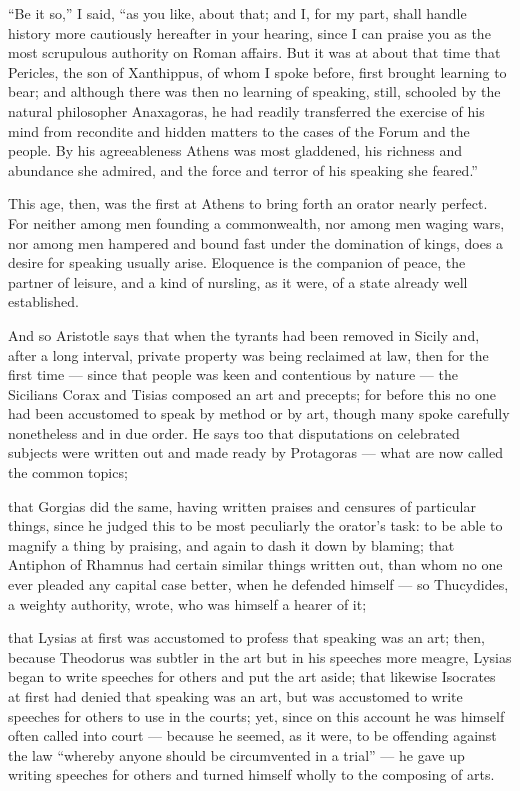  ``Be it so,'' I said, ``as you like, about that; and I, for my part, shall handle history more cautiously hereafter in your hearing, since I can praise you as the most scrupulous authority on Roman affairs. But it was at about that time that Pericles, the son of Xanthippus, of whom I spoke before, first brought learning to bear; and although there was then no learning of speaking, still, schooled by the natural philosopher Anaxagoras, he had readily transferred the exercise of his mind from recondite and hidden matters to the cases of the Forum and the people. By his agreeableness Athens was most gladdened, his richness and abundance she admired, and the force and terror of his speaking she feared.''

 This age, then, was the first at Athens to bring forth an orator nearly perfect. For neither among men founding a commonwealth, nor among men waging wars, nor among men hampered and bound fast under the domination of kings, does a desire for speaking usually arise. Eloquence is the companion of peace, the partner of leisure, and a kind of nursling, as it were, of a state already well established.

 And so Aristotle says that when the tyrants had been removed in Sicily and, after a long interval, private property was being reclaimed at law, then for the first time — since that people was keen and contentious by nature — the Sicilians Corax and Tisias composed an art and precepts; for before this no one had been accustomed to speak by method or by art, though many spoke carefully nonetheless and in due order. He says too that disputations on celebrated subjects were written out and made ready by Protagoras — what are now called the common topics;

 that Gorgias did the same, having written praises and censures of particular things, since he judged this to be most peculiarly the orator's task: to be able to magnify a thing by praising, and again to dash it down by blaming; that Antiphon of Rhamnus had certain similar things written out, than whom no one ever pleaded any capital case better, when he defended himself — so Thucydides, a weighty authority, wrote, who was himself a hearer of it;

 that Lysias at first was accustomed to profess that speaking was an art; then, because Theodorus was subtler in the art but in his speeches more meagre, Lysias began to write speeches for others and put the art aside; that likewise Isocrates at first had denied that speaking was an art, but was accustomed to write speeches for others to use in the courts; yet, since on this account he was himself often called into court — because he seemed, as it were, to be offending against the law ``whereby anyone should be circumvented in a trial'' — he gave up writing speeches for others and turned himself wholly to the composing of arts.

